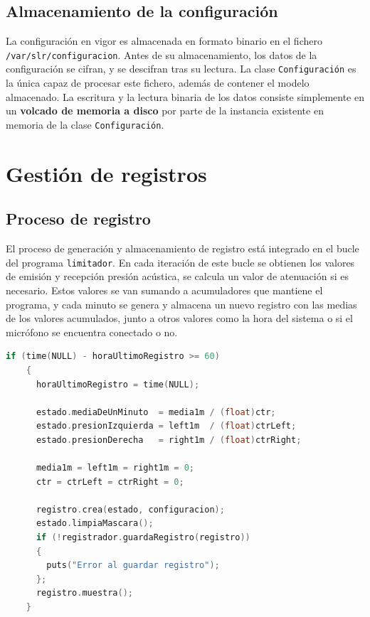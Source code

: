 \subsection{Almacenamiento de la configuración}

La configuración en vigor es almacenada en formato binario en el fichero \verb|/var/slr/configuracion|. Antes de su almacenamiento, los datos de la configuración se cifran, y se descifran tras su lectura. La clase \verb|Configuración| es la única capaz de procesar este fichero, además de contener el modelo almacenado. La escritura y la lectura binaria de los datos consiste simplemente en un \textbf{volcado de memoria a disco} por parte de la instancia existente en memoria de la clase \verb|Configuración|.

\clearpage
\section{Gestión de registros}

\subsection{Proceso de registro}

El proceso de generación y almacenamiento de registro está integrado en el bucle del programa \verb|limitador|. En cada iteración de este bucle se obtienen los valores de emisión y recepción presión acústica, se calcula un valor de atenuación si es necesario. Estos valores se van sumando a acumuladores que mantiene el programa, y cada minuto se genera y almacena un nuevo registro con las medias de los valores acumulados, junto a otros valores como la hora del sistema o si el micrófono se encuentra conectado o no. \\

\begin{lstlisting}[language=c++, label={lst:lms7-registrador}, caption={Generación de registros en el LM7.}]
    if (time(NULL) - horaUltimoRegistro >= 60)
    {
      horaUltimoRegistro = time(NULL);

      estado.mediaDeUnMinuto  = media1m / (float)ctr;
      estado.presionIzquierda = left1m  / (float)ctrLeft;
      estado.presionDerecha   = right1m / (float)ctrRight;

      media1m = left1m = right1m = 0;
      ctr = ctrLeft = ctrRight = 0;

      registro.crea(estado, configuracion);
      estado.limpiaMascara();
      if (!registrador.guardaRegistro(registro))
      {
        puts("Error al guardar registro");
      };
      registro.muestra();
    }
\end{lstlisting}

